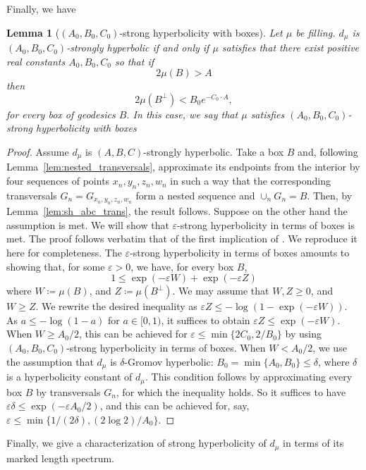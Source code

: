 \documentclass[12pt]{amsart}
\numberwithin{equation}{section}
\numberwithin{figure}{section}
\newtheorem{lemma}[equation]{Lemma}
\theoremstyle{definition}
\theoremstyle{plain}
\renewcommand{\epsilon}{\varepsilon}
\begin{document}
Finally, we have
\begin{lemma}[$(A_0,B_0,C_0)$-strong hyperbolicity with boxes]
Let $\mu$ be filling.
$d_{\mu}$ is $(A_0,B_0,C_0)$-strongly hyperbolic if and only if $\mu$ satisfies that there exist positive real constants $A_0,B_0,C_0$ so 
that if
\[
2\mu(B) > A
\]
then
\[
2\mu(B^{\perp})< B_0 e^{-C_0 \cdot A},
\]
for every box of geodesics $B$.
In this case, we say that $\mu$ satisfies \emph{$(A_0,B_0,C_0)$-strong hyperbolicity with boxes}
\label{lem:abc_sh_boxes}
\end{lemma}
\begin{proof}
Assume $d_{\mu}$ is $(A,B,C)$-strongly hyperbolic. Take a box $B$ and, following Lemma~\ref{lem:nested_transversals}, approximate its endpoints from the interior by four sequences of points $x_n,y_n,z_n,w_n$ in such a way that the corresponding transversals $G_{n}=G_{x_n,y_n,z_n,w_n}$ form a nested sequence and $\cup_n G_n = B$.
Then, by Lemma~\ref{lem:sh_abc_trans}, the result follows.
Suppose on the other hand the assumption is met.
We will show that $\epsilon$-strong hyperbolicity in terms of boxes is met. The proof follows verbatim that of the first implication of \cite[Lemma~6.2]{BS16:StrongHyp}.
We reproduce it here for completeness.
The $\epsilon$-strong hyperbolicity in terms of boxes amounts to showing that, for some $\epsilon>0$, we have,
for every box $B$,
\[
1 \leq \exp(-\epsilon W)+\exp(-\epsilon Z)
\]
where $W \coloneqq \mu(B)$, and $Z \coloneqq \mu(B^{\perp})$.
We may assume that $W,Z\geq 0$, and $W\geq Z$. We rewrite the desired inequality as $\epsilon Z\leq -\log (1-\exp(-\epsilon W))$. As $a\leq -\log(1-a)$ for $a\in [0,1)$, it suffices to obtain $\epsilon Z\leq \exp(-\epsilon W)$. When $W\geq A_0/2$, this can be achieved for $\epsilon \leq \min\{2C_0,2/B_0\}$ by using $(A_0,B_0,C_0)$-strong hyperbolicity in terms of boxes. When $W<A_0/2$, we use the assumption that $d_\mu$ is $\delta$-Gromov hyperbolic: $B_0=\min\{A_0,B_0\}\leq \delta$, where $\delta$ is a hyperbolicity constant of $d_\mu$. This condition follows by approximating every box $B$ by transversals $G_n$, for which the inequality holds. So it suffices to have $\epsilon\delta\leq \exp(-\epsilon A_0/2)$, and this can be achieved for, say, $\epsilon\leq \min\{1/(2\delta), (2\log 2)/A_0\}$.
\end{proof}

Finally, we give a characterization of strong hyperbolicity of $d_\mu$ in terms of its marked length spectrum. 
\end{document}
